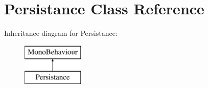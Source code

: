 \hypertarget{class_persistance}{}\section{Persistance Class Reference}
\label{class_persistance}
Inheritance diagram for Persistance\+:\begin{figure}[H]
\begin{center}
\leavevmode
\includegraphics[height=2.000000cm]{class_persistance}
\end{center}
\end{figure}
